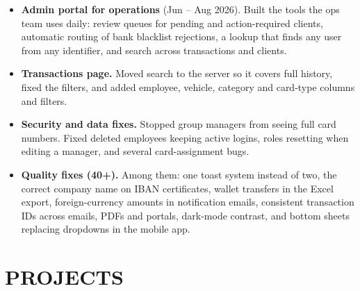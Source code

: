\documentclass[11pt,a4paper,roman]{moderncv}
\begin{document}
{\begin{itemize}
\item \textbf{Admin portal for operations} (Jun -- Aug 2026). Built the tools the ops team uses daily: review queues for pending and action-required clients, automatic routing of bank blacklist rejections, a lookup that finds any user from any identifier, and search across transactions and clients.
\item \textbf{Transactions page.} Moved search to the server so it covers full history, fixed the filters, and added employee, vehicle, category and card-type columns and filters.
\item \textbf{Security and data fixes.} Stopped group managers from seeing full card numbers. Fixed deleted employees keeping active logins, roles resetting when editing a manager, and several card-assignment bugs.
\item \textbf{Quality fixes (40+).} Among them: one toast system instead of two, the correct company name on IBAN certificates, wallet transfers in the Excel export, foreign-currency amounts in notification emails, consistent transaction IDs across emails, PDFs and portals, dark-mode contrast, and bottom sheets replacing dropdowns in the mobile app.
\end{itemize}
}

\section{PROJECTS}
\end{document}
